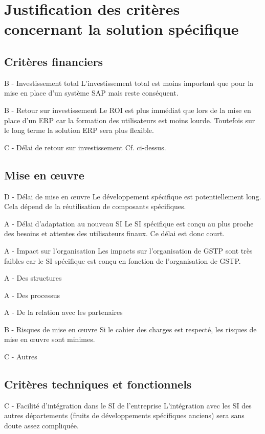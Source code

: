 \section{Justification des critères concernant la solution spécifique}

\subsection{Critères financiers}

B - Investissement total
L'investissement total est moins important que pour la mise en place d'un
système SAP mais reste conséquent.

B - Retour sur investissement
Le ROI est plus immédiat que lors de la mise en place d'un ERP car la
formation des utilisateurs est moins lourde. Toutefois sur le long terme la
solution ERP sera plus flexible.

C - Délai de retour sur investissement
Cf. ci-dessus.

\subsection{Mise en œuvre}

D - Délai de mise en œuvre
Le développement spécifique est potentiellement long. Cela dépend de la
réutilisation de composants spécifiques.

A - Délai d'adaptation au nouveau SI
Le SI spécifique est conçu au plus proche des besoins et attentes des
utilisateurs finaux. Ce délai est donc court.

A - Impact sur l'organisation
Les impacts sur l'organisation de GSTP sont très faibles car le SI
spécifique est conçu en fonction de l'organisation de GSTP.

	A - Des structures

	A - Des processus

	A - De la relation avec les partenaires

B - Risques de mise en œuvre
Si le cahier des charges est respecté, les risques de mise en \oe{}uvre
sont minimes.

C - Autres

\subsection{Critères techniques et fonctionnels}

C - Facilité d'intégration dans le SI de l'entreprise
L'intégration avec les SI des autres départements (fruits de développements
spécifiques anciens) sera sans doute assez compliquée.

